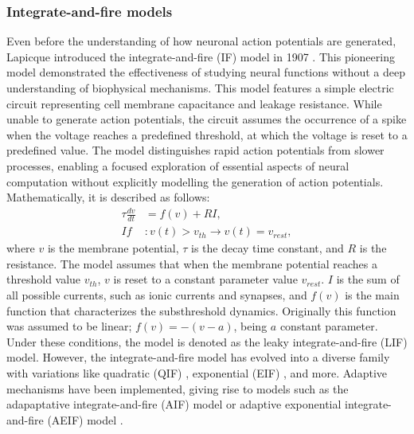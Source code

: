 \documentclass[../main.tex]{subfiles}
\begin{document}
\subsubsection{Integrate-and-fire models}
Even before the understanding of how neuronal action potentials are generated, Lapicque introduced the integrate-and-fire (IF) model in 1907 \citep{abbott_lapicques_1999}.
This pioneering model demonstrated the effectiveness of studying neural functions without a deep understanding of biophysical mechanisms.
This model features a simple electric circuit representing cell membrane capacitance and leakage resistance.
While unable to generate action potentials, the circuit assumes the occurrence of a spike when the voltage reaches a predefined threshold, at which the voltage is reset to a predefined value.
The model distinguishes rapid action potentials from slower processes, enabling a focused exploration of essential aspects of neural computation without explicitly modelling the generation of action potentials.
Mathematically, it is described as follows:
\begin{equation}
    \begin{aligned}
        \tau\displaystyle\frac{dv}{dt} &=f(v) + RI,\\
        If &: v(t) > v_{th} \rightarrow v(t) = v_{rest},
        \label{integrate-and-fire}
    \end{aligned}
\end{equation}
where $v$ is the membrane potential, $\tau$ is the decay time constant, and $R$ is the resistance.
The model assumes that when the membrane potential reaches a threshold value $v_{th}$, $v$ is reset to a constant parameter value $v_{rest}$.
$I$ is the sum of all possible currents, such as ionic currents and synapses, and $f(v)$ is the main function that characterizes the substhreshold dynamics.
Originally this function was assumed to be linear; $f(v) = -(v-a)$, being $a$ constant parameter.
Under these conditions, the model is denoted as the leaky integrate-and-fire (LIF) model.
However, the integrate-and-fire model has evolved into a diverse family with variations like quadratic (QIF) \citep{ermentrout1986parabolic}, exponential (EIF) \citep{fourcaud2003spike}, and more.
Adaptive mechanisms have been implemented, giving rise to models such as  the adapaptative integrate-and-fire (AIF) model \citep{doi:10.1098/rsif.2019.0246} or adaptive exponential integrate-and-fire (AEIF) model \citep{brette_adaptive_2005}.
\end{document}
